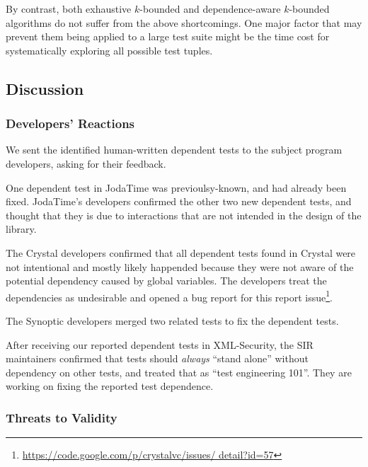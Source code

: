 By contrast, both exhaustive $k$-bounded and dependence-aware
$k$-bounded algorithms do not suffer from the above shortcomings.
One major factor that may prevent them being applied to a
large test suite might be the time cost for systematically
exploring all possible test tuples.





\subsection{Discussion}
\label{sec:expdiscussion}

\subsubsection{Developers' Reactions}

We sent the identified human-written dependent tests to the
subject program developers, asking for their feedback.

One dependent test in JodaTime was previoulsy-known,
and had already been fixed. JodaTime's
developers confirmed the other two new dependent
tests, and thought that they is due to interactions
that are not intended in the design of the library.

The Crystal developers confirmed that all dependent tests
found in Crystal were not intentional and mostly likely
happended because they were not aware of the potential dependency
caused by global variables. The developers treat the
dependencies as undesirable and opened a bug report for
this report issue\footnote{\url{https://code.google.com/p/crystalvc/issues/ detail?id=57}}.

The Synoptic developers merged two related tests to fix
the dependent tests.

After receiving our reported dependent tests in XML-Security,
the SIR~\cite{sir} maintainers 
confirmed that tests should \textit{always} ``stand alone''
without dependency on other tests, and treated that as
``test engineering 101''. They are working on fixing the reported
test dependence.

\subsubsection{Threats to Validity}

